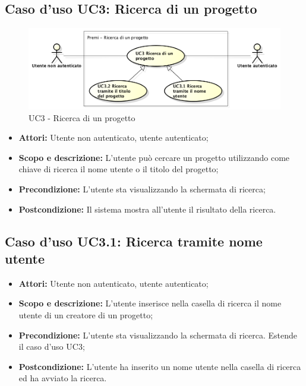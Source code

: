 \subsection{Caso d'uso UC3: Ricerca di un progetto}
\begin{figure}[h] 
	\centering 
	\includegraphics[scale=0.45] {img/UC3.png} 
	\caption{UC3 - Ricerca di un progetto} 
\end{figure}

\begin{itemize}
	\item \textbf{Attori:} Utente non autenticato, utente autenticato;
	\item \textbf{Scopo e descrizione:} L'utente può cercare un progetto utilizzando come chiave di ricerca il nome utente o il titolo del progetto;
	\item \textbf{Precondizione:} L'utente sta visualizzando la schermata di ricerca;
	\item \textbf{Postcondizione:} Il sistema mostra all'utente il risultato della ricerca.
\end{itemize}

\subsection{Caso d'uso UC3.1: Ricerca tramite nome utente}
\begin{itemize}
	\item \textbf{Attori:} Utente non autenticato, utente autenticato;
	\item \textbf{Scopo e descrizione:} L'utente inserisce nella casella di ricerca il nome utente di un creatore di un progetto;
	\item \textbf{Precondizione:} L'utente sta visualizzando la schermata di ricerca. Estende il caso d'uso UC3;
	\item \textbf{Postcondizione:} L'utente ha inserito un nome utente nella casella di ricerca ed ha avviato la ricerca.
\end{itemize}

